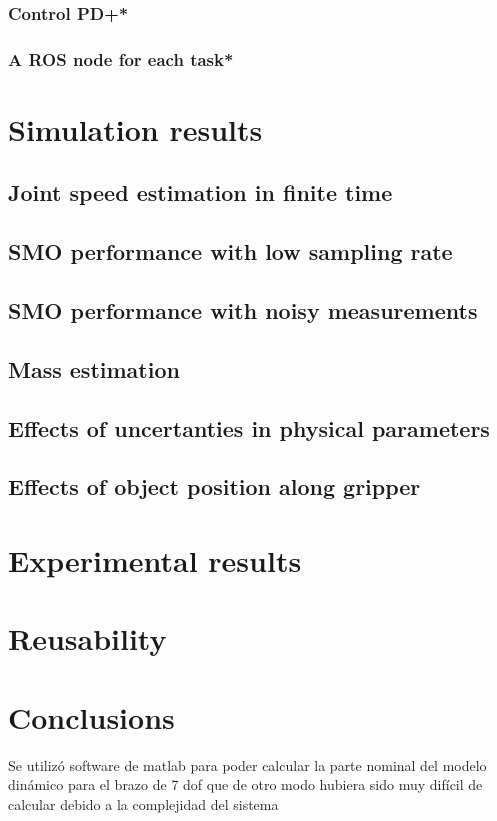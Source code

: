 \documentclass[a4paper, 10pt]{article}
\begin{document}
\subsubsection{Control PD+*}

\subsubsection{A ROS node for each task*}

\section{Simulation results}
\subsection{Joint speed estimation in finite time}

\subsection{SMO performance with low sampling rate}

\subsection{SMO performance with noisy measurements}

\subsection{Mass estimation}

\subsection{Effects of uncertanties in physical parameters}

\subsection{Effects of object position along gripper}

\section{Experimental results}

\section{Reusability}

\section{Conclusions}
Se utilizó software de matlab para poder calcular la parte nominal del modelo dinámico para el brazo de 7 dof que de otro modo hubiera sido muy difícil de calcular debido a la complejidad del sistema



\end{document}
